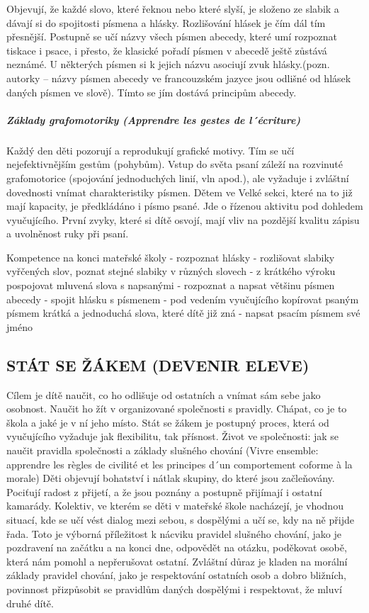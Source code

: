 			Objevují, že každé slovo, které řeknou nebo které slyší, je složeno ze slabik a dávají si do spojitosti písmena a hlásky. Rozlišování hlásek je čím dál tím přesnější. Postupně se učí názvy všech písmen abecedy, které umí rozpoznat tiskace i psace, i přesto, že klasické pořadí písmen v abecedě ještě zůstává neznámé. U některých písmen si k jejich názvu asociují zvuk hlásky.(pozn. autorky – názvy písmen abecedy ve francouzském jazyce jsou odlišné od hlásek daných písmen ve slově). Tímto se jím dostává principům abecedy.


			\subparagraph{Základy grafomotoriky (Apprendre les gestes de l´écriture)}
			Každý den děti pozorují a reprodukují grafické motivy. Tím se učí nejefektivnějším gestům (pohybům). Vstup do světa psaní záleží na rozvinuté grafomotorice (spojování jednoduchých linií, vln apod.), ale vyžaduje i zvláštní dovednosti vnímat charakteristiky písmen. 
			Dětem ve Velké sekci, které na to již mají kapacity, je předkládáno i písmo psané. Jde o řízenou aktivitu pod dohledem vyučujícího. První zvyky, které si dítě osvojí, mají vliv na pozdější kvalitu zápisu a uvolněnost ruky při psaní. 

		Kompetence na konci mateřské školy
		- rozpoznat hlásky
		- rozlišovat slabiky vyřčených slov, poznat stejné slabiky v různých slovech
		- z krátkého výroku pospojovat mluvená slova s napsanými
		- rozpoznat a napsat většinu písmen abecedy
		- spojit hlásku s písmenem
		- pod vedením vyučujícího kopírovat psaným písmem krátká a jednoduchá slova, které dítě již zná
		- napsat psacím písmem své jméno

	\subsection{STÁT SE ŽÁKEM (DEVENIR ELEVE)}
		Cílem je dítě naučit, co ho odlišuje od ostatních a vnímat sám sebe jako osobnost. Naučit ho žít v organizované společnosti s pravidly. Chápat, co je to škola a jaké je v ní jeho místo. Stát se žákem je postupný proces, která od vyučujícího vyžaduje jak flexibilitu, tak přísnost.
		Život ve společnosti: jak se naučit pravidla společnosti a základy slušného chování (Vivre ensemble: apprendre les règles de civilité et les principes d´un comportement coforme à la morale)
		Děti objevují bohatství i nátlak skupiny, do které jsou začleňovány. Pociťují radost z přijetí, a že jsou poznány a postupně přijímají i ostatní kamarády. Kolektiv, ve kterém se děti v mateřské škole nacházejí, je vhodnou situací, kde se učí vést dialog mezi sebou, s dospělými a učí se, kdy na ně přijde řada. Toto je výborná příležitost k nácviku pravidel slušného chování, jako je pozdravení na začátku a na konci dne, odpovědět na otázku, poděkovat osobě, která nám pomohl a nepřerušovat ostatní. Zvláštní důraz je kladen na morální základy pravidel chování, jako je respektování ostatních osob a dobro bližních, povinnost přizpůsobit se pravidlům daných dospělými i respektovat, že mluví druhé dítě. 

